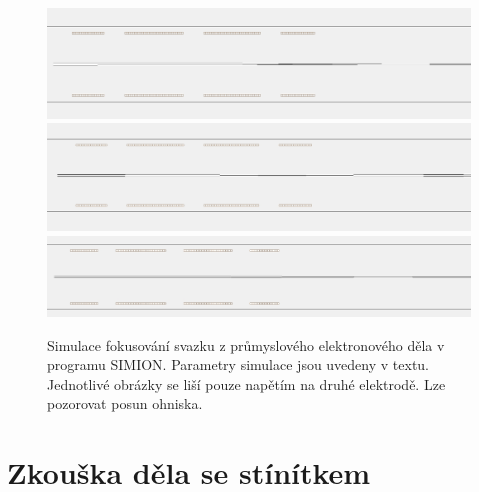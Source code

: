 \begin{figure}[htbp!]
\centering
\includegraphics[width = \textwidth]{Figure/05/1a.jpg}
\vfill
\vspace{0.22cm}
\includegraphics[width = \linewidth]{Figure/05/1b.jpg}
\vfill
\vspace{0.22cm}
\includegraphics[width = \linewidth]{Figure/05/1c.jpg}
\caption[Simulace fokusování svazku z průmyslového elektronového děla v programu SIMION.]{Simulace fokusování svazku z průmyslového elektronového děla v programu SIMION. Parametry simulace jsou uvedeny v textu. Jednotlivé obrázky se liší pouze napětím na druhé elektrodě. Lze pozorovat posun ohniska.}
\label{05simulaceFinalniKonfigurace}
\end{figure}

\section{Zkouška děla se stínítkem} \label{TestDela}

